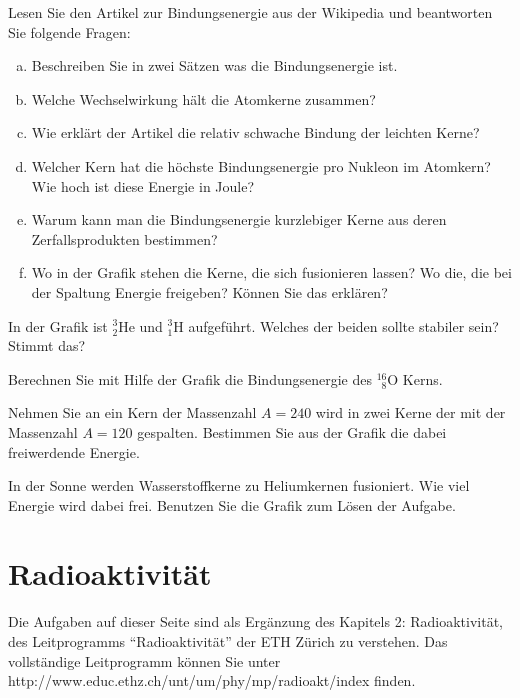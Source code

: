 \documentclass[12pt,a4paper,twoside]{article}
\newcommand{\Kern}[3]{$^{#1}_{\phantom{1}#2}\text{#3}$}
\begin{document}
\begin{aufgabe}
	Lesen Sie den Artikel zur Bindungsenergie aus der Wikipedia und beantworten Sie folgende Fragen:
	\begin{enumerate} [a)]
		\item Beschreiben Sie in zwei Sätzen was die Bindungsenergie ist.
		\item Welche Wechselwirkung hält die Atomkerne zusammen?
		\item Wie erklärt der Artikel die relativ schwache Bindung der leichten Kerne?
		\item Welcher Kern hat die höchste Bindungsenergie pro Nukleon im Atomkern? Wie hoch ist diese Energie in Joule?
		\item Warum kann man die Bindungsenergie kurzlebiger Kerne aus deren Zerfallsprodukten bestimmen?
		\item Wo in der Grafik stehen die Kerne, die sich fusionieren lassen? Wo die, die bei der Spaltung Energie freigeben? Können Sie das erklären?
	\end{enumerate}
\end{aufgabe}

\begin{aufgabe}
 In der Grafik ist $^3_2\text{He}$ und $^3_1\text{H}$ aufgeführt. Welches der beiden sollte stabiler sein? Stimmt das?
\end{aufgabe}

\begin{aufgabe}
	Berechnen Sie mit Hilfe der Grafik die Bindungsenergie des \Kern{16}{8}{O} Kerns.
\end{aufgabe}


\begin{aufgabe}
	Nehmen Sie an ein Kern der Massenzahl $A=240$ wird in zwei Kerne der mit der Massenzahl $A=120$ gespalten. Bestimmen Sie aus der Grafik die dabei
	freiwerdende Energie.
\end{aufgabe}

\begin{aufgabe}
	In der Sonne werden Wasserstoffkerne zu Heliumkernen fusioniert.
	Wie viel Energie wird dabei frei. Benutzen Sie die Grafik zum Lösen der Aufgabe.
\end{aufgabe}

\newpage

\section*{Radioaktivität}

Die Aufgaben auf dieser Seite sind als Ergänzung des Kapitels 2: Radioaktivität, des Leitprogramms ``Radioaktivität'' der ETH Zürich zu verstehen.
Das vollständige Leitprogramm können Sie unter http://www.educ.ethz.ch/unt/um/phy/mp/radioakt/index finden.
\end{document}

